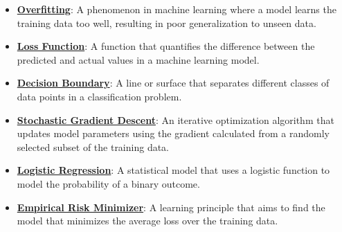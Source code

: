 \documentclass{article}%
\begin{document}
\begin{itemize}[leftmargin=*]
\item \href{https://purdue.brightspace.com/d2l/common/assets/pdfjs-d2l-dist/1.0.14-legacy/web/viewer.html?file=%2Fcontent%2Fenforced%2F1095467-wl.202510.CS.24300.001%2F05L2-ML Basics.pdf%3Fou%3D1095467&lang=en-us&container=d2l-fileviewer-rendered-pdf&fullscreen=d2l-fileviewer-rendered-pdf-dialog&height=667#page=14}{\textbf{Overfitting}}: A phenomenon in machine learning where a model learns the training data too well, resulting in poor generalization to unseen data.%
\item \href{https://purdue.brightspace.com/d2l/common/assets/pdfjs-d2l-dist/1.0.14-legacy/web/viewer.html?file=%2Fcontent%2Fenforced%2F1095467-wl.202510.CS.24300.001%2F05L2-ML Basics.pdf%3Fou%3D1095467&lang=en-us&container=d2l-fileviewer-rendered-pdf&fullscreen=d2l-fileviewer-rendered-pdf-dialog&height=667#page=25}{\textbf{Loss Function}}: A function that quantifies the difference between the predicted and actual values in a machine learning model.%
\item \href{https://purdue.brightspace.com/d2l/common/assets/pdfjs-d2l-dist/1.0.14-legacy/web/viewer.html?file=%2Fcontent%2Fenforced%2F1095467-wl.202510.CS.24300.001%2F05L2-ML Basics.pdf%3Fou%3D1095467&lang=en-us&container=d2l-fileviewer-rendered-pdf&fullscreen=d2l-fileviewer-rendered-pdf-dialog&height=667#page=24}{\textbf{Decision Boundary}}: A line or surface that separates different classes of data points in a classification problem.%
\item \href{https://purdue.brightspace.com/d2l/common/assets/pdfjs-d2l-dist/1.0.14-legacy/web/viewer.html?file=%2Fcontent%2Fenforced%2F1095467-wl.202510.CS.24300.001%2F05L2-ML Basics.pdf%3Fou%3D1095467&lang=en-us&container=d2l-fileviewer-rendered-pdf&fullscreen=d2l-fileviewer-rendered-pdf-dialog&height=667#page=29}{\textbf{Stochastic Gradient Descent}}: An iterative optimization algorithm that updates model parameters using the gradient calculated from a randomly selected subset of the training data.%
\item \href{https://purdue.brightspace.com/d2l/common/assets/pdfjs-d2l-dist/1.0.14-legacy/web/viewer.html?file=%2Fcontent%2Fenforced%2F1095467-wl.202510.CS.24300.001%2F05L2-ML Basics.pdf%3Fou%3D1095467&lang=en-us&container=d2l-fileviewer-rendered-pdf&fullscreen=d2l-fileviewer-rendered-pdf-dialog&height=667#page=31}{\textbf{Logistic Regression}}: A statistical model that uses a logistic function to model the probability of a binary outcome.%
\item \href{https://purdue.brightspace.com/d2l/common/assets/pdfjs-d2l-dist/1.0.14-legacy/web/viewer.html?file=%2Fcontent%2Fenforced%2F1095467-wl.202510.CS.24300.001%2F05L2-ML Basics.pdf%3Fou%3D1095467&lang=en-us&container=d2l-fileviewer-rendered-pdf&fullscreen=d2l-fileviewer-rendered-pdf-dialog&height=667#page=15}{\textbf{Empirical Risk Minimizer}}: A learning principle that aims to find the model that minimizes the average loss over the training data.%

\end{itemize}
\end{document}
